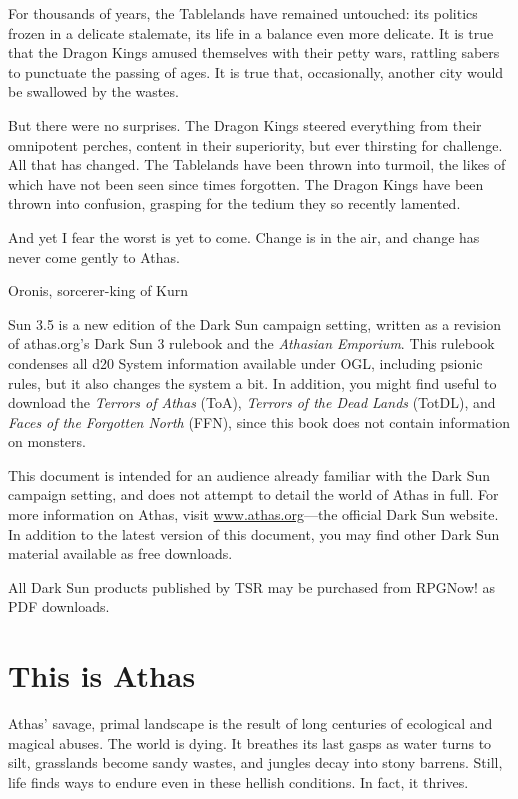 {For thousands of years, the Tablelands have remained untouched: its politics frozen in a delicate stalemate, its life in a balance even more delicate. It is true that the Dragon Kings amused themselves with their petty wars, rattling sabers to punctuate the passing of ages. It is true that, occasionally, another city would be swallowed by the wastes.

But there were no surprises. The Dragon Kings steered everything from their omnipotent perches, content in their superiority, but ever thirsting for challenge. All that has changed. The Tablelands have been thrown into turmoil, the likes of which have not been seen since times forgotten. The Dragon Kings have been thrown into confusion, grasping for the tedium they so recently lamented.

And yet I fear the worst is yet to come. Change is in the air, and change has never come gently to Athas.}{Oronis, sorcerer-king of Kurn}


 Sun 3.5 is a new edition of the {\tableheader Dark Sun} campaign setting, written as a revision of athas.org's {\tableheader Dark Sun} 3 rulebook and the \emph{Athasian Emporium}. This rulebook condenses all d20 System information available under OGL, including psionic rules, but it also changes the system a bit. In addition, you might find useful to download the \emph{Terrors of Athas} (ToA), \emph{Terrors of the Dead Lands} (TotDL), and \emph{Faces of the Forgotten North} (FFN), since this book does not contain information on monsters.

This document is intended for an audience already familiar with the {\tableheader Dark Sun} campaign setting, and does not attempt to detail the world of Athas in full. For more information on Athas, visit \url{www.athas.org}---the official {\tableheader Dark Sun} website. In addition to the latest version of this document, you may find other {\tableheader Dark Sun} material available as free downloads.

All {\tableheader Dark Sun} products published by TSR may be purchased from RPGNow! as PDF downloads.

\section{This is Athas}
Athas' savage, primal landscape is the result of long centuries of ecological and magical abuses. The world is dying. It breathes its last gasps as water turns to silt, grasslands become sandy wastes, and jungles decay into stony barrens. Still, life finds ways to endure even in these hellish conditions. In fact, it thrives.

